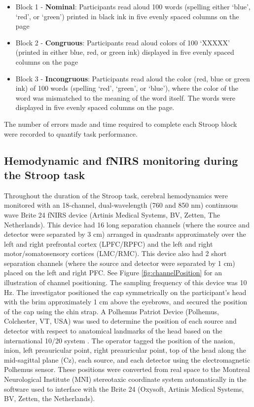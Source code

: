 \documentclass[12pt]{spieman}  %
\begin{document}
\begin{spacing}{2}
\begin{itemize}
\item{Block 1 - \textbf{Nominal}: Participants read aloud 100 words (spelling either `blue', `red', or `green') printed in black ink in five evenly spaced columns on the page}
\item{Block 2 - \textbf{Congruous}: Participants read aloud colors of 100 `XXXXX' (printed in either blue, red, or green ink) displayed in five evenly spaced columns on the page}
\item{Block 3 - \textbf{Incongruous}: Participants read aloud the color (red, blue or green ink) of 100 words (spelling `red', `green', or `blue'), where the color of the word was mismatched to the meaning of the word itself. The words were displayed in five evenly spaced columns on the page}. 
\end{itemize}

The number of errors made and time required to complete each Stroop block were recorded to quantify task performance. 

\subsection{Hemodynamic and fNIRS monitoring during the Stroop task}

Throughout the duration of the Stroop task, cerebral hemodynamics were monitored with an 18-channel, dual-wavelength (760 and 850 nm) continuous wave Brite 24 fNIRS device (Artinis Medical Systems, BV, Zetten, The Netherlands). This device had 16 long separation channels (where the source and detector were separated by 3 cm) arranged in quadrants approximately over the left and right prefrontal cortex (LPFC/RPFC) and the left and right motor/somatosensory cortices (LMC/RMC). This device also had 2 short separation channels (where the source and detector were separated by 1 cm) placed on the left and right PFC. See Figure \ref{fig:channelPosition} for an illustration of channel positioning. The sampling frequency of this device was 10 Hz. The investigator positioned the cap symmetrically on the participant's head with the brim approximately 1 cm above the eyebrows, and secured the position of the cap using the chin strap. A Polhemus Patriot Device (Polhemus, Colchester, VT, USA) was used to determine the position of each source and detector with respect to anatomical landmarks of the head based on the international 10/20 system \cite{Jurcak2007}. The operator tagged the position of the nasion, inion, left preauricular point, right preauricular point, top of the head along the mid-sagittal plane (Cz), each source, and each detector using the electromagnetic Polhemus sensor. These positions were converted from real space to the Montreal Neurological Institute (MNI) stereotaxic coordinate system automatically in the software used to interface with the Brite 24 (Oxysoft, Artinis Medical Systems, BV, Zetten, the Netherlands). 


\end{spacing}
\end{document}
